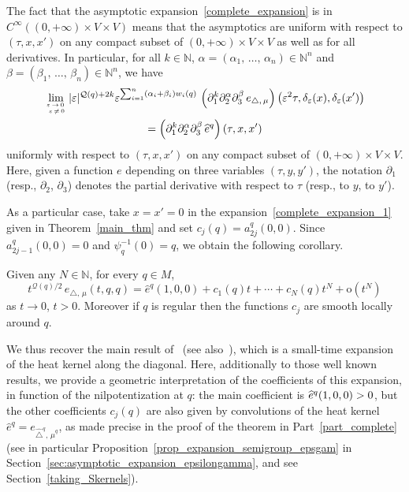 \documentclass[AHL,Unicode,published]{cedram}
\newcommand*\N{\mathbb{N}}
\newcommand{\calQ}{\mathcal{Q}}
\newcommand{\rmo}{\mathrm{o}}
\begin{document}
The fact that the asymptotic expansion~\eqref{complete_expansion} is in $C^\infty((0,+\infty)\times V\times V)$ means that the asymptotics are uniform with respect to $(\tau,x,x')$ on any compact subset of $(0,+\infty)\times V\times V$ as well as for all derivatives. In particular, for all $k\in\N$, $\alpha=(\alpha_1,\,\ldots,\,\alpha_n)\in\N^n$ and $\beta=(\beta_1,\,\ldots,\,\beta_n)\in\N^n$, we have
\begin{multline*}
\lim_{\varepsilon\,\rightarrow\,0\,\atop\,\varepsilon\,\neq\,0} \vert\varepsilon\vert^{\calQ(q)+2k} \varepsilon^{\sum_{i=1}^n (\alpha_i+\beta_i)w_i(q)}\, \left(\partial_1^k \partial_2^\alpha \partial_{3}^\beta \, e_{\triangle,\,\mu}\right) \left(\varepsilon^2 \tau,\delta_\varepsilon(x),\delta_\varepsilon(x')\right)\\
 = \left(\partial_1^k \partial_2^\alpha \partial_{3}^\beta \, \widehat{e}^{q}\right) (\tau,x,x')
\end{multline*}
uniformly with respect to $(\tau,x,x')$ on any compact subset of $(0,+\infty)\times V\times V$. Here, given a function $e$ depending on three variables $(\tau,y,y')$, the notation $\partial_1$ (resp., $\partial_2$, $\partial_3$) denotes the partial derivative with respect to $\tau$ (resp., to $y$, to $y'$).


As a particular case, take $x=x'=0$ in the expansion~\eqref{complete_expansion_1} given in Theorem~\ref{main_thm} and set $c_j(q) = a_{2j}^{q}(0,0)$. Since $a_{2j-1}^{q}(0,0)=0$ and $\psi_{q}^{-1}(0)=q$, we obtain the following corollary.

\begin{coro}
Given any $N\in\N$, for every $q\in M$,
\[
t^{\calQ(q)/2}\, e_{\triangle,\,\mu}(t,q,q) = \widehat{e}^{q}(1,0,0) + c_1(q) t + \cdots + c_N(q) t^N + \rmo\left(t^{N}\right)
\]
as $t\rightarrow 0$, $t>0$. Moreover if $q$ is regular then the functions $c_j$ are smooth locally around $q$.
\end{coro}

We thus recover the main result of~\cite{BenArous_AIF1989} (see also~\cite{Metivier1976}), which is a small-time expansion of the heat kernel along the diagonal. Here, additionally to those well known results, we provide a geometric interpretation of the coefficients of this expansion, in function of the nilpotentization at $q$: the main coefficient is $\widehat{e}^{q}(1,0,0)\linebreak>0$, but the other coefficients $c_j(q)$ are also given by convolutions of the heat kernel $\widehat{e}^{q}=e_{\widehat{\triangle}^{q},\,\widehat{\mu}^{q}}$, as made precise in the proof of the theorem in Part~\ref{part_complete} (see in particular Proposition~\ref{prop_expansion_semigroup_epsgam} in Section~\ref{sec:asymptotic_expansion_epsilongamma}, and see Section~\ref{taking_Skernels}).
\end{document}

